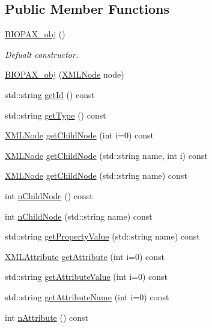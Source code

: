\subsection*{Public Member Functions}
\begin{DoxyCompactItemize}
\item 
\hyperlink{classunisys_1_1BIOPAX__obj_a4b3addbe446cd1407297942edc9d4241}{B\-I\-O\-P\-A\-X\-\_\-obj} ()
\begin{DoxyCompactList}\small\item\em Defualt constructor. \end{DoxyCompactList}\item 
\hyperlink{classunisys_1_1BIOPAX__obj_a782d016f1b5b5473cf4a871740242d6c}{B\-I\-O\-P\-A\-X\-\_\-obj} (\hyperlink{structXMLNode}{X\-M\-L\-Node} node)
\item 
std\-::string \hyperlink{classunisys_1_1BIOPAX__obj_aab0b0ed0fa5ea280af2082fa17d2667b}{get\-Id} () const 
\item 
std\-::string \hyperlink{classunisys_1_1BIOPAX__obj_ab909dfd9a95c60b5a826d228187741ff}{get\-Type} () const 
\item 
\hyperlink{structXMLNode}{X\-M\-L\-Node} \hyperlink{classunisys_1_1BIOPAX__obj_a1c847f963c9fcb1377ea35a1eeffc1fb}{get\-Child\-Node} (int i=0) const 
\item 
\hyperlink{structXMLNode}{X\-M\-L\-Node} \hyperlink{classunisys_1_1BIOPAX__obj_a21ca7b5d9ce6c932cf3def1768659402}{get\-Child\-Node} (std\-::string name, int i) const 
\item 
\hyperlink{structXMLNode}{X\-M\-L\-Node} \hyperlink{classunisys_1_1BIOPAX__obj_ac426e52509f9f242cf9e4da4ad888302}{get\-Child\-Node} (std\-::string name) const 
\item 
int \hyperlink{classunisys_1_1BIOPAX__obj_af5fe9ed5f554f9b531096e2c8730d341}{n\-Child\-Node} () const 
\item 
int \hyperlink{classunisys_1_1BIOPAX__obj_a35ea6c7c1dcf7f8301c984cfe23aa455}{n\-Child\-Node} (std\-::string name) const 
\item 
std\-::string \hyperlink{classunisys_1_1BIOPAX__obj_a123c67a39d7e9a13bb7fd04b53184590}{get\-Property\-Value} (std\-::string name) const 
\item 
\hyperlink{structXMLAttribute}{X\-M\-L\-Attribute} \hyperlink{classunisys_1_1BIOPAX__obj_a9b73fc23de3e6d71637e254ce2076b21}{get\-Attribute} (int i=0) const 
\item 
std\-::string \hyperlink{classunisys_1_1BIOPAX__obj_ae853daef65696243d402ba2e9c375c7a}{get\-Attribute\-Value} (int i=0) const 
\item 
std\-::string \hyperlink{classunisys_1_1BIOPAX__obj_a3bc3fea7bdb5f60200cebde5406a5ec4}{get\-Attribute\-Name} (int i=0) const 
\item 
int \hyperlink{classunisys_1_1BIOPAX__obj_a6b13a03cba244ce45036ae67da132f83}{n\-Attribute} () const 
\end{DoxyCompactItemize}
